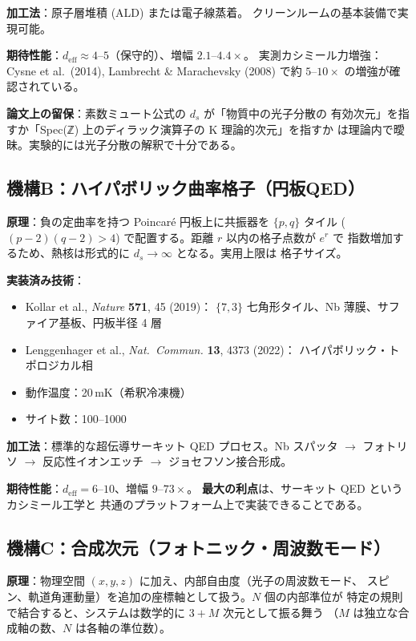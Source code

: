 \documentclass[11pt,a4paper]{article}
\newcommand{\deff}{d_{\mathrm{eff}}}
\begin{document}
\textbf{加工法}：原子層堆積 (ALD) または電子線蒸着。
クリーンルームの基本装備で実現可能。

\textbf{期待性能}：$\deff \approx 4$--$5$（保守的）、増幅 $2.1$--$4.4\times$。
実測カシミール力増強：Cysne et al.\ (2014), Lambrecht \& Marachevsky (2008)
で約 $5$--$10\times$ の増強が確認されている。

\textbf{論文上の留保}：素数ミュート公式の $d_s$ が「物質中の光子分散の
有効次元」を指すか「Spec(ℤ) 上のディラック演算子の K 理論的次元」を指すか
は理論内で曖昧。実験的には光子分散の解釈で十分である。

\subsection{機構B：ハイパボリック曲率格子（円板QED）}
\label{sec:hyperbolic_disk}

\textbf{原理}：負の定曲率を持つ Poincar\'e 円板上に共振器を $\{p,q\}$
タイル ($(p-2)(q-2)>4$) で配置する。距離 $r$ 以内の格子点数が $e^r$ で
指数増加するため、熱核は形式的に $d_s\to\infty$ となる。実用上限は
格子サイズ。

\textbf{実装済み技術}：
\begin{itemize}[leftmargin=2em,nosep]
  \item Kollar et al., \textit{Nature} \textbf{571}, 45 (2019)：
        $\{7,3\}$ 七角形タイル、Nb 薄膜、サファイア基板、円板半径 4 層
  \item Lenggenhager et al., \textit{Nat.\ Commun.} \textbf{13}, 4373 (2022)：
        ハイパボリック・トポロジカル相
  \item 動作温度：20\,mK（希釈冷凍機）
  \item サイト数：100--1000
\end{itemize}

\textbf{加工法}：標準的な超伝導サーキット QED プロセス。Nb スパッタ
$\to$ フォトリソ $\to$ 反応性イオンエッチ $\to$ ジョセフソン接合形成。

\textbf{期待性能}：$\deff = 6$--$10$、増幅 $9$--$73\times$。
\textbf{最大の利点}は、サーキット QED というカシミール工学と
共通のプラットフォーム上で実装できることである。

\subsection{機構C：合成次元（フォトニック・周波数モード）}
\label{sec:synthetic}

\textbf{原理}：物理空間 $(x,y,z)$ に加え、内部自由度（光子の周波数モード、
スピン、軌道角運動量）を追加の座標軸として扱う。$N$ 個の内部準位が
特定の規則で結合すると、システムは数学的に $3+M$ 次元として振る舞う
（$M$ は独立な合成軸の数、$N$ は各軸の準位数）。
\end{document}
